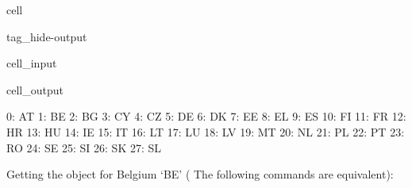 \documentclass[letterpaper,10pt,english]{sphinxmanual}
\begin{document}
\begin{sphinxuseclass}{cell}
\begin{sphinxuseclass}{tag_hide-output}
\begin{sphinxuseclass}{cell_input}
\begin{sphinxVerbatim}[commandchars=\\\{\}]
\end{sphinxVerbatim}

\end{sphinxuseclass}
\begin{sphinxuseclass}{cell_output}
\begin{sphinxVerbatim}[commandchars=\\\{\}]
0: AT 
1: BE 
2: BG 
3: CY 
4: CZ 
5: DE 
6: DK 
7: EE 
8: EL 
9: ES 
10: FI
11: FR
12: HR
13: HU
14: IE
15: IT
16: LT
17: LU
18: LV
19: MT
20: NL
21: PL
22: PT
23: RO
24: SE
25: SI
26: SK
27: SL
\end{sphinxVerbatim}

\end{sphinxuseclass}
\end{sphinxuseclass}
\end{sphinxuseclass}
\sphinxAtStartPar
Getting the  object for Belgium ‘BE’ ( The following commands are equivalent):
\end{document}

